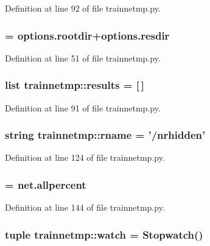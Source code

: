 Definition at line 92 of file trainnetmp.py.

\hypertarget{namespacetrainnetmp_ab566ffaeaa6913a2b2b347cff1a608a4}{
\subsubsection[{resdir}]{ = options.rootdir+options.resdir}}
\label{namespacetrainnetmp_ab566ffaeaa6913a2b2b347cff1a608a4}


Definition at line 51 of file trainnetmp.py.

\hypertarget{namespacetrainnetmp_acf60722e6b94f8b6613aff40c374d19f}{
\subsubsection[{results}]{\setlength{\rightskip}{0pt plus 5cm}list {\bf trainnetmp::results} = \mbox{[}$\,$\mbox{]}}}
\label{namespacetrainnetmp_acf60722e6b94f8b6613aff40c374d19f}


Definition at line 91 of file trainnetmp.py.

\hypertarget{namespacetrainnetmp_a01a4fd22ee2cc1aba08b4566d95bb2a4}{
\subsubsection[{rname}]{\setlength{\rightskip}{0pt plus 5cm}string {\bf trainnetmp::rname} = '/nrhidden'}}
\label{namespacetrainnetmp_a01a4fd22ee2cc1aba08b4566d95bb2a4}


Definition at line 124 of file trainnetmp.py.

\hypertarget{namespacetrainnetmp_a72596b0af8ecedd242cba70b6819b03d}{
\subsubsection[{val}]{ = net.allpercent}}
\label{namespacetrainnetmp_a72596b0af8ecedd242cba70b6819b03d}


Definition at line 144 of file trainnetmp.py.

\hypertarget{namespacetrainnetmp_ad0c5cbbe64c5ef22afe865ff2f038740}{
\subsubsection[{watch}]{\setlength{\rightskip}{0pt plus 5cm}tuple {\bf trainnetmp::watch} = Stopwatch()}}
\label{namespacetrainnetmp_ad0c5cbbe64c5ef22afe865ff2f038740}


